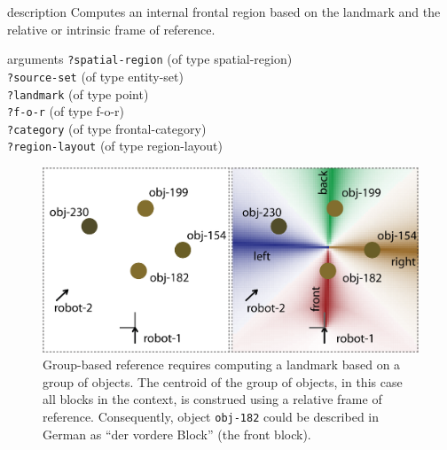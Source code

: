 \begin{explanation}{description}
Computes an internal frontal region based on the landmark
and the relative or intrinsic frame of reference.
\end{explanation}
\begin{explanation}{arguments}
{\footnotesize\verb+?spatial-region+} (of type spatial-region) \\
{\footnotesize\verb+?source-set+} (of type entity-set) \\
{\footnotesize\verb+?landmark+} (of type point)\\
{\footnotesize\verb+?f-o-r+} (of type f-o-r)\\
{\footnotesize\verb+?category+} (of type frontal-category)\\
{\footnotesize\verb+?region-layout+} (of type region-layout)
\vspace{0.3cm}
\end{explanation}

\begin{figure}
\begin{centering}
\includegraphics[width=0.7\columnwidth]{figs/space-scene-3483324847-group-based-reference.png}
\caption[Group-based reference explanation.]
{Group-based reference requires computing a landmark based on 
a group of objects. The centroid of the group of objects, in this case 
all blocks in the context, is construed using a relative frame of reference.
Consequently, object {\footnotesize\tt obj-182} could be described in German as 
``der vordere Block'' (the front block).}
\label{f:space-scene-2}
\end{centering}
\end{figure}

